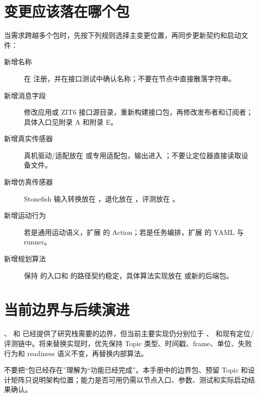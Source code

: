 \section{变更应该落在哪个包}
当需求跨越多个包时，先按下列规则选择主变更位置，再同步更新契约和启动文件：

\begin{description}
  \item[新增名称] 在  注册，并在接口测试中确认名称；不要在节点中直接散落字符串。
  \item[新增消息字段] 修改应用或 ZIT6 接口源目录，重新构建接口包，再修改发布者和订阅者；具体入口见附录 A 和附录 E。
  \item[新增真实传感器] 真机驱动/适配放在  或专用适配包，输出进入 ；不要让定位器直接读取设备文件。
  \item[新增仿真传感器] Stonefish 输入转换放在 ，退化放在 ，评测放在 。
  \item[新增运动行为] 若是通用运动语义，扩展  的 Action；若是任务编排，扩展  的 YAML 与 runner。
  \item[新增规划算法] 保持  的入口和  的路径契约稳定，具体算法实现放在  或新的后端包。
\end{description}

\section{当前边界与后续演进}
、 和  已经提供了研究栈需要的边界，但当前主要实现仍分别位于 、 和现有定位/评测链中。将来替换实现时，优先保持 Topic 类型、时间戳、frame、单位、失败行为和 readiness 语义不变，再替换内部算法。

\begin{warningbox}
不要把“包已经存在”理解为“功能已经完成”。本手册中的边界包、预留 Topic 和设计矩阵只说明架构位置；能力是否可用仍需以节点入口、参数、测试和实际启动结果确认。
\end{warningbox}
